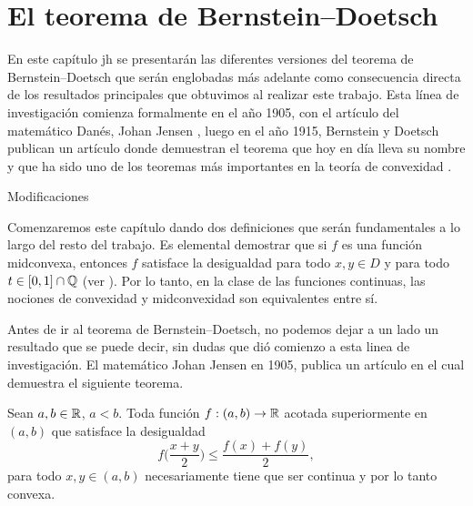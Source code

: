 \chapter{El teorema de Bernstein--Doetsch}
\setcounter{theorem}{0}
\label{chapPrevio}

En este capítulo jh se presentarán las diferentes versiones 
del teorema de Bernstein--Doetsch que serán englobadas más 
adelante como consecuencia directa de los resultados principales que
obtuvimos al realizar este trabajo. Esta línea de investigación
comienza formalmente en el año 1905, con el artículo del matemático 
Danés, Johan Jensen \cite{Jen06}, luego en el año 1915, Bernstein y Doetsch 
publican un artículo donde demuestran el teorema que hoy en día lleva su nombre 
y que ha sido uno de los teoremas más importantes en la teoría de convexidad \cite{Kuc09}. 

Modificaciones 

Comenzaremos este capítulo dando dos definiciones que serán fundamentales
a lo largo del resto del trabajo.
Es elemental demostrar que si $f$ es una función midconvexa,
entonces $f$ satisface la desigualdad  para todo
$x,y\in D$ y para todo $t\in[0,1]\cap\mathbb{Q}$ (ver \cite{Kuc09}). 
Por lo tanto, en la clase de las funciones continuas, las nociones
de convexidad y midconvexidad son equivalentes entre sí.

Antes de ir al teorema de Bernstein--Doetsch, no podemos dejar a un lado un resultado 
que se puede decir, sin dudas que dió comienzo a esta linea de investigación. 
El matemático Johan Jensen en 1905, 
publica un artículo en el cual demuestra el siguiente teorema. 

\begin{theorem}
\label{TJensenFirst}
Sean $a,b\in\mathbb{R}$, $a<b$. 
Toda función $f:(a,b)\to\mathbb{R}$ acotada superiormente en $(a,b)$ que satisface 
la desigualdad
$$
f\bigg(\frac{x+y}{2}\bigg)\leq \frac{f(x)+f(y)}{2},
$$
para todo $x,y\in (a,b)$ necesariamente tiene que ser continua
y por lo tanto convexa.
\end{theorem}

